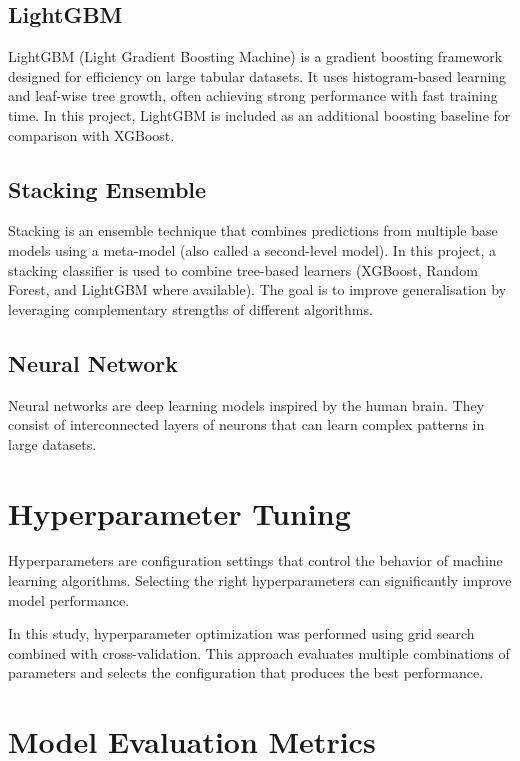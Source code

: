\subsection{LightGBM}

LightGBM (Light Gradient Boosting Machine) is a gradient boosting framework designed for efficiency on large tabular datasets. It uses histogram-based learning and leaf-wise tree growth, often achieving strong performance with fast training time. In this project, LightGBM is included as an additional boosting baseline for comparison with XGBoost.

\subsection{Stacking Ensemble}

Stacking is an ensemble technique that combines predictions from multiple base models using a meta-model (also called a second-level model). In this project, a stacking classifier is used to combine tree-based learners (XGBoost, Random Forest, and LightGBM where available). The goal is to improve generalisation by leveraging complementary strengths of different algorithms.

\subsection{Neural Network}

Neural networks are deep learning models inspired by the human brain. They consist of interconnected layers of neurons that can learn complex patterns in large datasets.

\section{Hyperparameter Tuning}

Hyperparameters are configuration settings that control the behavior of machine learning algorithms. Selecting the right hyperparameters can significantly improve model performance.

In this study, hyperparameter optimization was performed using grid search combined with cross-validation. This approach evaluates multiple combinations of parameters and selects the configuration that produces the best performance.

\section{Model Evaluation Metrics}

